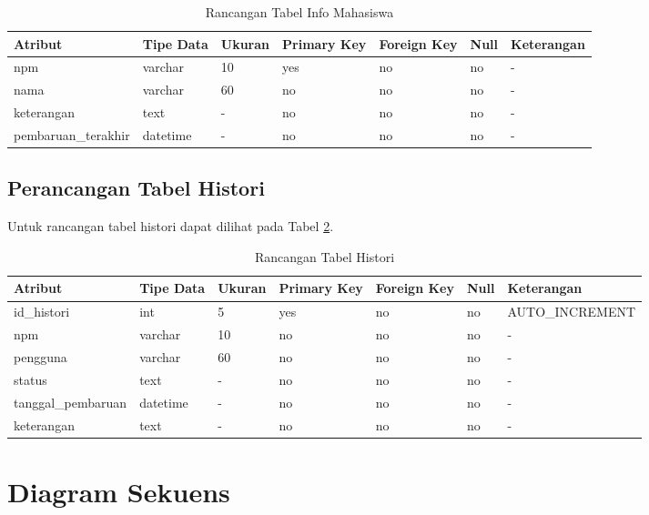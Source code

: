 \begin{table}[h]
\caption[Tabel Rancangan Tabel Info Mahasiswa]{Rancangan Tabel Info Mahasiswa}
\label{tab:rancangantabelinfomahasiswa}
\begin{tabular}{|l|p{1.5cm}|p{1.2cm}|p{1.2cm}|p{1.2cm}|p{0.8cm}|l|}
\hline
Atribut & Tipe Data & Ukuran & Primary Key & Foreign Key & Null & Keterangan\\
\hline
npm & varchar & 10 & yes & no & no & -\\
\hline
nama & varchar & 60 & no & no & no & -\\
\hline
keterangan & text & - & no & no & no & -\\
\hline
pembaruan\_terakhir & datetime & - & no & no & no & -\\
\hline
\end{tabular}
\end{table}

\subsection{Perancangan Tabel Histori}
Untuk rancangan tabel histori dapat dilihat pada Tabel
\ref{tab:rancangantabelhistori}.

\begin{table}[h]
\caption[Tabel Rancangan Tabel Histori]{Rancangan Tabel Histori}
\label{tab:rancangantabelhistori}
\begin{tabular}{|l|p{1.5cm}|p{1.2cm}|p{1.2cm}|p{1.2cm}|p{0.8cm}|l|}
\hline
Atribut & Tipe Data & Ukuran & Primary Key & Foreign Key & Null & Keterangan\\
\hline
id\_histori & int & 5 & yes & no & no & AUTO\_INCREMENT\\
\hline
npm & varchar & 10 & no & no & no & -\\
\hline
pengguna & varchar & 60 & no & no & no & -\\
\hline
status & text & - & no & no & no & -\\
\hline
tanggal\_pembaruan & datetime & - & no & no & no & -\\
\hline
keterangan & text & - & no & no & no & -\\
\hline
\end{tabular}
\end{table}

\section{Diagram Sekuens}
\label{sec:diagramsekuens}

